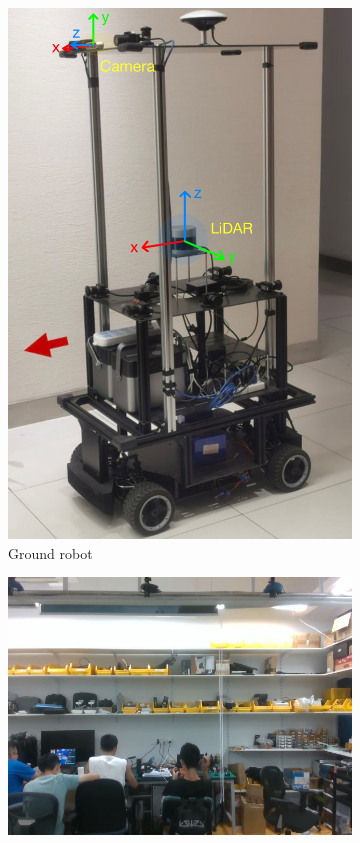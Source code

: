 \begin{figure}
  \centering
  \begin{subfigure}{0.14\linewidth}
    \centering
    \includegraphics[width=\linewidth]{images/ground_robot.jpg}
    \caption{Ground robot}
    \label{fig:ground_robot}
  \end{subfigure}
  \hfill
  \begin{subfigure}{0.28\linewidth}
    \centering
    \includegraphics[width=\linewidth]{images/room.png}

\end{subfigure}
\end{figure}
